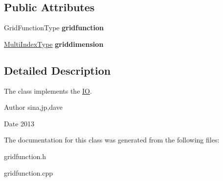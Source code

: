 \subsection*{Public Attributes}
\begin{DoxyCompactItemize}
\item 
\hypertarget{class_grid_function_a5867918365aab37ead25cd3ebfc846e4}{Grid\-Function\-Type {\bfseries gridfunction}}\label{class_grid_function_a5867918365aab37ead25cd3ebfc846e4}

\item 
\hypertarget{class_grid_function_a4f0b5b147512e4307b0b3fc777d0b200}{\hyperlink{class_array}{Multi\-Index\-Type} {\bfseries griddimension}}\label{class_grid_function_a4f0b5b147512e4307b0b3fc777d0b200}

\end{DoxyCompactItemize}


\subsection{Detailed Description}
The class implements the \hyperlink{class_i_o}{I\-O}. 

\begin{DoxyAuthor}{Author}
sina,jp,dave 
\end{DoxyAuthor}
\begin{DoxyDate}{Date}
2013 
\end{DoxyDate}


The documentation for this class was generated from the following files\-:\begin{DoxyCompactItemize}
\item 
gridfunction.\-h\item 
gridfunction.\-cpp\end{DoxyCompactItemize}
